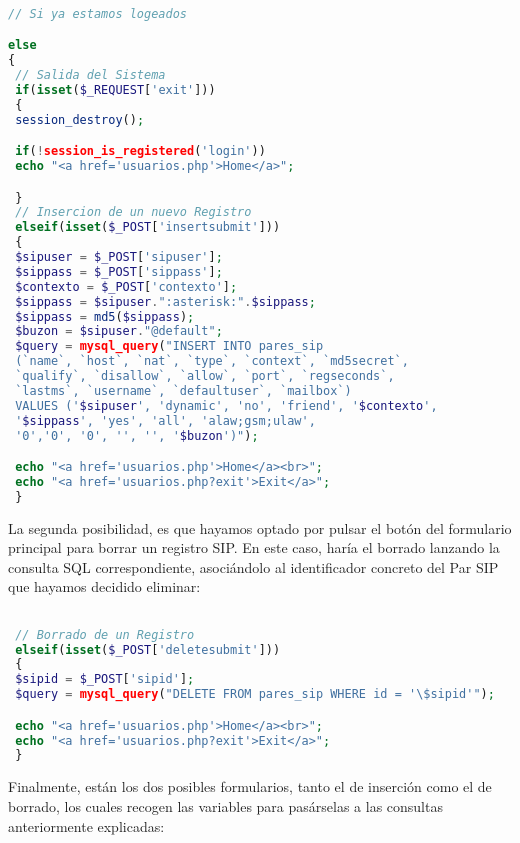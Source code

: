 \begin{lstlisting}[language=php,title={./www/usuarios.php}]

// Si ya estamos logeados

else
{
 // Salida del Sistema
 if(isset($_REQUEST['exit']))
 {
 session_destroy();

 if(!session_is_registered('login'))
 echo "<a href='usuarios.php'>Home</a>";

 }
 // Insercion de un nuevo Registro
 elseif(isset($_POST['insertsubmit']))
 {
 $sipuser = $_POST['sipuser'];
 $sippass = $_POST['sippass'];
 $contexto = $_POST['contexto'];
 $sippass = $sipuser.":asterisk:".$sippass;
 $sippass = md5($sippass);
 $buzon = $sipuser."@default";
 $query = mysql_query("INSERT INTO pares_sip 
 (`name`, `host`, `nat`, `type`, `context`, `md5secret`, 
 `qualify`, `disallow`, `allow`, `port`, `regseconds`, 
 `lastms`, `username`, `defaultuser`, `mailbox`)
 VALUES ('$sipuser', 'dynamic', 'no', 'friend', '$contexto', 
 '$sippass', 'yes', 'all', 'alaw;gsm;ulaw',
 '0','0', '0', '', '', '$buzon')");

 echo "<a href='usuarios.php'>Home</a><br>";
 echo "<a href='usuarios.php?exit'>Exit</a>";
 }

\end{lstlisting}

La segunda posibilidad, es que hayamos optado por pulsar el botón del formulario principal para borrar un registro SIP. En este caso, haría el borrado lanzando la consulta SQL correspondiente, asociándolo al identificador concreto del Par SIP que hayamos decidido eliminar:

\begin{lstlisting}[language=php,title={./www/usuarios.php}]

 // Borrado de un Registro
 elseif(isset($_POST['deletesubmit']))
 {
 $sipid = $_POST['sipid'];
 $query = mysql_query("DELETE FROM pares_sip WHERE id = '\$sipid'");

 echo "<a href='usuarios.php'>Home</a><br>";
 echo "<a href='usuarios.php?exit'>Exit</a>";
 }

\end{lstlisting}

Finalmente, están los dos posibles formularios, tanto el de inserción como el de borrado, los cuales recogen las variables para pasárselas a las consultas anteriormente explicadas:

